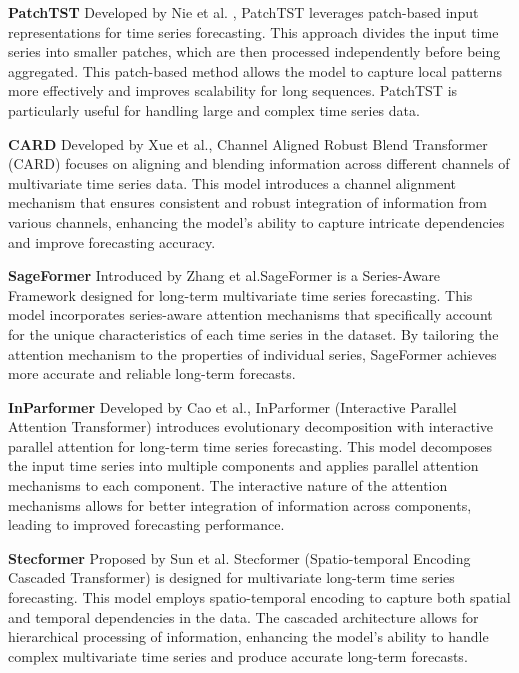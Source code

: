 \noindent\textbf
{PatchTST}
 Developed by Nie et al.\cite{nie2023timeseriesworth64} , PatchTST leverages patch-based input representations for time series forecasting. This approach divides the input time series into smaller patches, which are then processed independently before being aggregated. This patch-based method allows the model to capture local patterns more effectively and improves scalability for long sequences. PatchTST is particularly useful for handling large and complex time series data.
\vspace{10pt}


\noindent\textbf
{CARD}
 Developed by Xue et al.\cite{xue2024cardchannelalignedrobust}, Channel Aligned Robust Blend Transformer (CARD) focuses on aligning and blending information across different channels of multivariate time series data. This model introduces a channel alignment mechanism that ensures consistent and robust integration of information from various channels, enhancing the model’s ability to capture intricate dependencies and improve forecasting accuracy.
\vspace{10pt}


\noindent\textbf
{SageFormer}
 Introduced by Zhang et al.\cite{zhang2023sageformerseriesawareframeworklongterm}SageFormer is a Series-Aware Framework designed for long-term multivariate time series forecasting. This model incorporates series-aware attention mechanisms that specifically account for the unique characteristics of each time series in the dataset. By tailoring the attention mechanism to the properties of individual series, SageFormer achieves more accurate and reliable long-term forecasts.
\vspace{10pt}


\noindent\textbf
{InParformer}
 Developed by Cao et al.\cite{Cao_Huang_Yao_Wang_He_Wang_2023}, InParformer (Interactive Parallel Attention Transformer) introduces evolutionary decomposition with interactive parallel attention for long-term time series forecasting. This model decomposes the input time series into multiple components and applies parallel attention mechanisms to each component. The interactive nature of the attention mechanisms allows for better integration of information across components, leading to improved forecasting performance.
\vspace{10pt}


\noindent\textbf
{Stecformer}
 Proposed by Sun et al.\cite{sun2023stecformerspatiotemporalencodingcascaded} Stecformer (Spatio-temporal Encoding Cascaded Transformer) is designed for multivariate long-term time series forecasting. This model employs spatio-temporal encoding to capture both spatial and temporal dependencies in the data. The cascaded architecture allows for hierarchical processing of information, enhancing the model’s ability to handle complex multivariate time series and produce accurate long-term forecasts.
\vspace{10pt}


